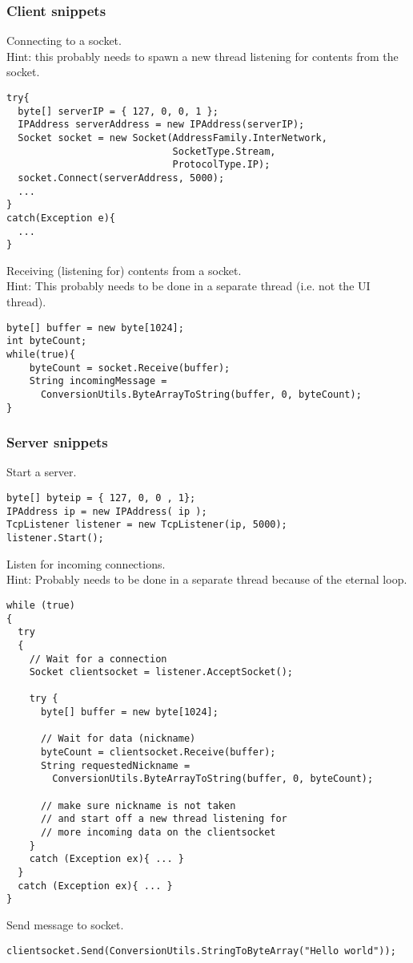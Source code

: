 \documentclass{article}
\begin{document}
\subsubsection{Client snippets}
Connecting to a socket.\\
Hint: this probably needs to spawn a new thread listening for contents from the socket.
\begin{lstlisting}
try{
  byte[] serverIP = { 127, 0, 0, 1 };
  IPAddress serverAddress = new IPAddress(serverIP);
  Socket socket = new Socket(AddressFamily.InterNetwork,
                             SocketType.Stream,
                             ProtocolType.IP);
  socket.Connect(serverAddress, 5000);
  ...
}
catch(Exception e){
  ...
}
\end{lstlisting}
Receiving (listening for) contents from a socket.\\
Hint: This probably needs to be done in a separate thread (i.e. not the UI thread).
\begin{lstlisting}
byte[] buffer = new byte[1024];
int byteCount;
while(true){
    byteCount = socket.Receive(buffer);
    String incomingMessage =
      ConversionUtils.ByteArrayToString(buffer, 0, byteCount);
}
\end{lstlisting}


\subsubsection{Server snippets}
Start a server.
\begin{lstlisting}
byte[] byteip = { 127, 0, 0 , 1};
IPAddress ip = new IPAddress( ip );
TcpListener listener = new TcpListener(ip, 5000);
listener.Start();
\end{lstlisting}

Listen for incoming connections.\\
Hint: Probably needs to be done in a separate thread because of the eternal loop.
\begin{lstlisting}
while (true)
{
  try
  {
    // Wait for a connection
    Socket clientsocket = listener.AcceptSocket();

    try {
      byte[] buffer = new byte[1024];
  
      // Wait for data (nickname)
      byteCount = clientsocket.Receive(buffer);
      String requestedNickname =
        ConversionUtils.ByteArrayToString(buffer, 0, byteCount);

      // make sure nickname is not taken
      // and start off a new thread listening for
      // more incoming data on the clientsocket
    }
    catch (Exception ex){ ... }
  }
  catch (Exception ex){ ... }
}
\end{lstlisting}
Send message to socket.
\begin{lstlisting}
clientsocket.Send(ConversionUtils.StringToByteArray("Hello world"));
\end{lstlisting}
\end{document}
